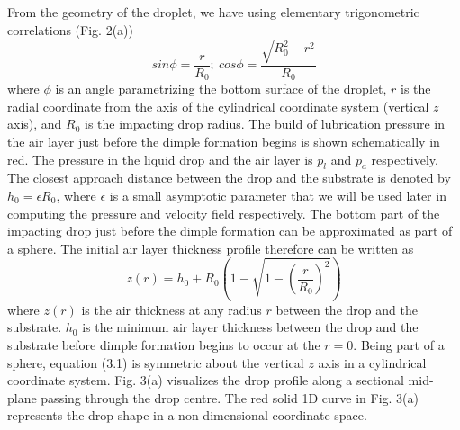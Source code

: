 \documentclass{jfm}
\begin{document}
From the geometry of the droplet, we have using elementary trigonometric correlations (Fig. 2(a))
\begin{equation*}
    sin{\phi} = \frac{r}{R_0};{\:}cos{\phi}=\frac{\sqrt{R_0^2-r^2}}{R_0}
\end{equation*} 
where ${\phi}$ is an angle parametrizing the bottom surface of the droplet, $r$ is the radial coordinate from the axis of the cylindrical coordinate system (vertical $z$ axis), and $R_0$ is the impacting drop radius. The build of lubrication pressure in the air layer just before the dimple formation begins is shown schematically in red. The pressure in the liquid drop and the air layer is $p_l$ and $p_a$ respectively. The closest approach distance between the drop and the substrate is denoted by $h_0={\epsilon}R_0$, where ${\epsilon}$ is a small asymptotic parameter that we will be used later in computing the pressure and velocity field respectively.   
The bottom part of the impacting drop just before the dimple formation can be approximated as part of a sphere. The initial air layer thickness profile therefore can be written as
\begin{equation}
    z(r) = h_0 + R_0\left(1-\sqrt{1-\left(\frac{r}{R_0}\right)^2}\right)
\end{equation}
where $z(r)$ is the air thickness at any radius $r$ between the drop and the substrate. $h_0$ is the minimum air layer thickness between the drop and the substrate before dimple formation begins to occur at the $r=0$. Being part of a sphere, equation (3.1) is symmetric about the vertical $z$ axis in a cylindrical coordinate system. Fig. 3(a) visualizes the drop profile along a sectional mid-plane passing through the drop centre. The red solid 1D curve in Fig. 3(a) represents the drop shape in a non-dimensional coordinate space.
\end{document}
